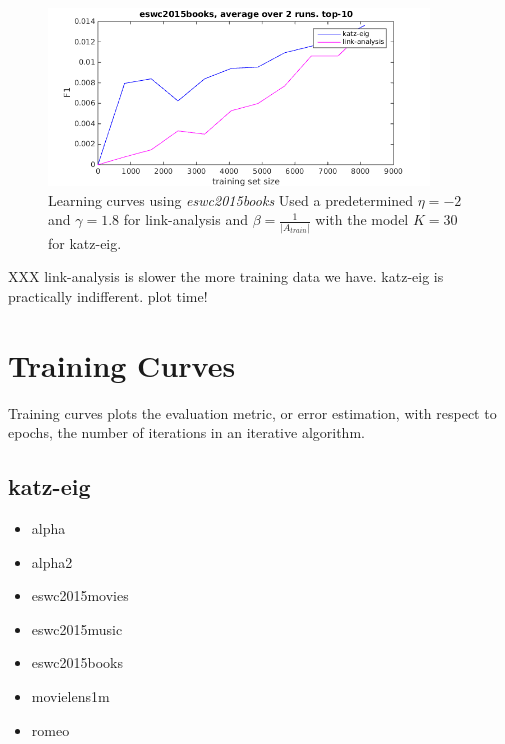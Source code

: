 \begin{figure}[ht]
  \centering
    \includegraphics[width=0.9\textwidth]{fig/learning_curves/eswc2015books_learning_curves.png}
    \caption{Learning curves using \textit{eswc2015books}
        Used a predetermined $\eta = -2$ and $\gamma = 1.8$ for link-analysis and $\beta = \frac{1}{|A_{train}|}$ with the model $K = 30$ for katz-eig.}
\end{figure}




XXX link-analysis is slower the more training data we have.
katz-eig is practically indifferent.
plot time!

\FloatBarrier


\section{Training Curves}\label{sec:training_curves}

Training curves plots the evaluation metric, or error estimation, with respect to epochs, the number of iterations in an iterative algorithm.

\subsection{katz-eig}

\begin{itemize}
    \item alpha
    \item alpha2
    \item eswc2015movies
    \item eswc2015music
    \item eswc2015books
    \item movielens1m
    \item romeo
\end{itemize}


